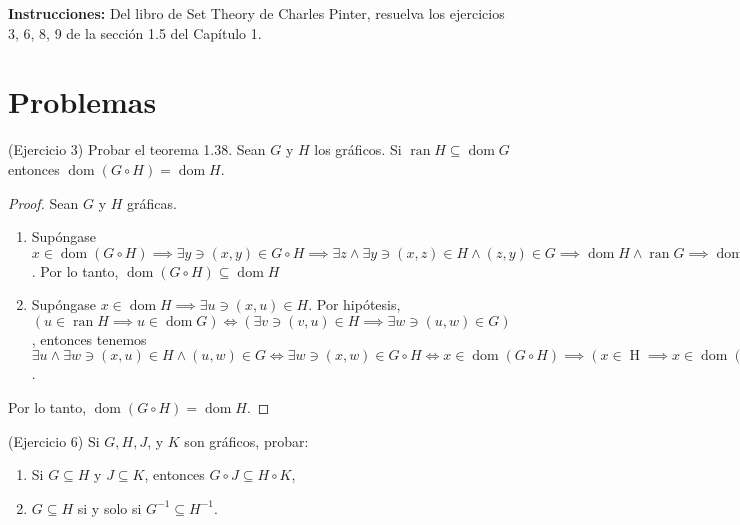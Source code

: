 




\textbf{Instrucciones:} Del libro de Set Theory de Charles Pinter, resuelva los ejercicios 3, 6, 8, 9 de la sección 1.5 del Capítulo 1.

\section{Problemas}
\begin{problema}(Ejercicio 3)
	Probar el teorema 1.38. Sean $G$ y $H$ los gráficos. Si $\operatorname{ran} H \subseteq  \operatorname{dom} G$ entonces $\operatorname{dom}(G\circ H)= \operatorname{dom} H$.
\end{problema}

\begin{proof}
	Sean $G$ y $H$ gráficas. 
	
	\begin{enumerate}
		\item[$(\implies)$] Supóngase $x\in \operatorname{dom}(G\circ H) \implies \exists y \ni (x,y)\in G\circ H\implies \exists z \wedge \exists y \ni (x,z)\in H\wedge (z,y)\in G\implies \operatorname{dom}H\wedge \operatorname{ran}G\implies \operatorname{dom}H$. Por lo tanto, $\operatorname{dom}(G\circ H)\subseteq \operatorname{dom} H$
		\item[$(\impliedby)$]  Supóngase $x\in \operatorname{dom} H\implies \exists u \ni (x,u) \in H$. Por hipótesis, $(u\in \operatorname{ran} H\implies u\in \operatorname{dom} G) \iff (\exists v \ni (v,u)\in H\implies \exists w  \ni (u,w)\in G)$,   entonces tenemos $\exists u \wedge \exists w \ni (x,u)\in H \wedge (u,w)\in G\iff \exists w\ni (x,w)\in G\circ H\iff x\in \operatorname{dom}(G\circ H)\implies (x\in \operatorname{H}\implies x\in \operatorname{dom}(G\circ H))\implies\operatorname{dom}H \subseteq  \operatorname{dom}(G\circ H)$.
	\end{enumerate}
Por lo tanto, $\operatorname{dom}(G\circ H)= \operatorname{dom} H$.
\end{proof}

\begin{problema}(Ejercicio 6)
	Si $G, H, J$, y $K$  son gráficos, probar: 
	\begin{enumerate}
		\item Si $G \subseteq H$ y $J \subseteq K$, entonces $G \circ J \subseteq H \circ K$,
		\item $G \subseteq H$ si y solo si $G^{-1} \subseteq H^{-1}$.
	\end{enumerate}
\end{problema}

